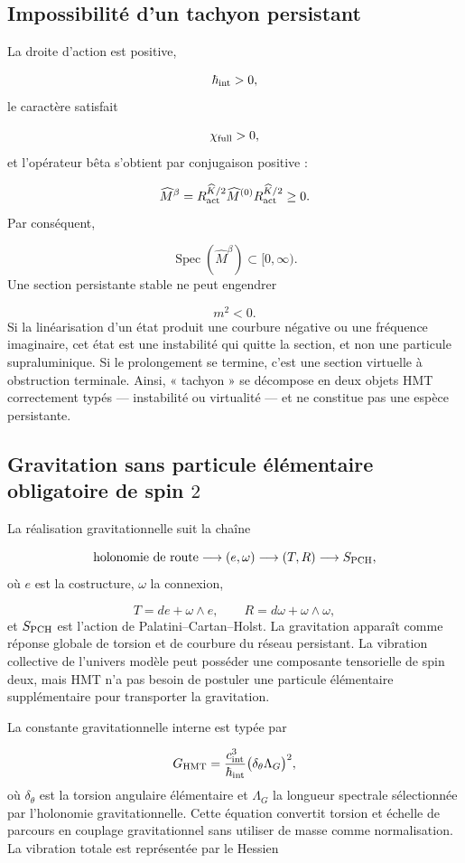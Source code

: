 \subsection{Impossibilité d'un tachyon persistant}
La droite d'action est positive,

\[
 \hbar_{\rm int}>0,
\]
le caractère satisfait

\[
 \chi_{\rm full}>0,
\]
et l'opérateur bêta s'obtient par conjugaison positive :

\[
 \widehat M^\beta
 =R_{\rm act}^{\widehat K/2}
 \widehat M^{(0)}
 R_{\rm act}^{\widehat K/2}\ge0.
\]
Par conséquent,

\[
 \operatorname{Spec}(\widehat M^\beta)\subset[0,\infty).
\]
Une section persistante stable ne peut engendrer

\[
 m^2<0.
\]
Si la linéarisation d'un état produit une courbure négative ou une fréquence imaginaire, cet état est une instabilité qui quitte la section, et non une particule supraluminique. Si le prolongement se termine, c'est une section virtuelle à obstruction terminale. Ainsi, « tachyon » se décompose en deux objets HMT correctement typés --- instabilité ou virtualité --- et ne constitue pas une espèce persistante.

\subsection{Gravitation sans particule élémentaire obligatoire de spin \(2\)}
La réalisation gravitationnelle suit la chaîne

\[
 \text{holonomie de route}
 \longrightarrow(e,\omega)
 \longrightarrow(T,R)
 \longrightarrow
 S_{\rm PCH},
\]
où \(e\) est la costructure, \(\omega\) la connexion,

\[
 T=de+\omega\wedge e,\qquad
 R=d\omega+\omega\wedge\omega,
\]
et \(S_{\rm PCH}\) est l'action de Palatini--Cartan--Holst. La gravitation apparaît comme réponse globale de torsion et de courbure du réseau persistant. La vibration collective de l'univers modèle peut posséder une composante tensorielle de spin deux, mais HMT n'a pas besoin de postuler une particule élémentaire supplémentaire pour transporter la gravitation.

La constante gravitationnelle interne est typée par

\[
 G_{\rm HMT}
 =\frac{c_{\rm int}^3}{\hbar_{\rm int}}
 \bigl(\delta_\theta\Lambda_G\bigr)^2,
\]
où \(\delta_\theta\) est la torsion angulaire élémentaire et \(\Lambda_G\) la longueur spectrale sélectionnée par l'holonomie gravitationnelle. Cette équation convertit torsion et échelle de parcours en couplage gravitationnel sans utiliser de masse comme normalisation. La vibration totale est représentée par le Hessien

